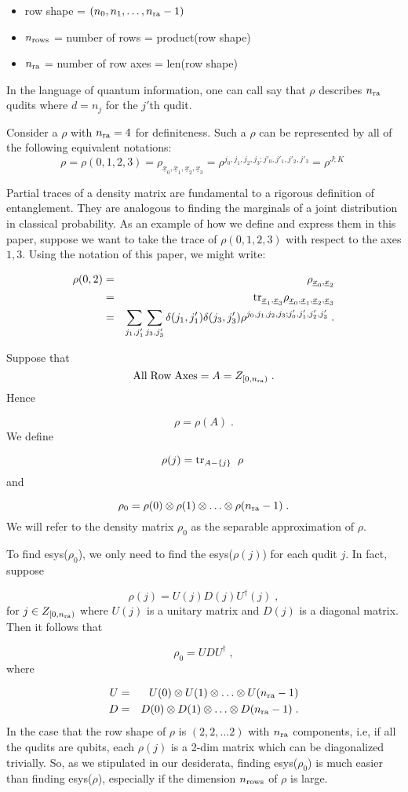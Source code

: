 \documentclass[12pt]{article}%
\newcommand{\tr}[0]{{\rm tr }}
\newcommand{\beq}{\begin{equation}}
\newcommand{\eeq}{\end{equation}}
\newcommand{\beqa}{\begin{eqnarray}}
\newcommand{\eeqa}{\end{eqnarray}}
\newcommand{\ul}[1]{\underline{#1}}
\newcommand{\rvx}[0]{{\ul{x}}}
\newcommand{\nra}[0]{{n_{\rm ra}}}
\newcommand{\nr}[0]{{n_{\rm rows}}}
\begin{document}
\begin{itemize}
\item row shape = $(n_0, n_1, \ldots, \nra-1)$
\item $\nr$ = number of rows = product(row shape)
\item $\nra$ = number of row axes = len(row shape)
\end{itemize}
In the language of quantum information,
one can call say that $\rho$ describes $\nra$
qudits where $d=n_j$ for the $j'$th qudit.

Consider a $\rho$
with $\nra = 4$ for definiteness.
Such a $\rho$ can be represented by all of the following
equivalent notations:
\beq
\rho= \rho(0, 1, 2, 3) =\rho_{\rvx_0, \rvx_1, \rvx_2, \rvx_3}=
\rho^{j_0, j_1, j_2, j_3; j'_0, j'_1, j'_2, j'_3}
=\rho^{J;K}
\;
\eeq

Partial traces
of a density matrix
are fundamental to a rigorous definition
of entanglement. They are analogous to
finding the marginals of a
joint distribution in classical
probability. As an example of how we define
and express them in this paper,
suppose we want to
take the trace of $\rho(0, 1, 2, 3)$
with respect to the axes $1, 3$.
Using the notation of
this paper, we might write:

\beqa
\rho(0,2) &=&\rho_{\rvx_0,\rvx_2}
\\&=&
\tr_{\rvx_1, \rvx_3}\rho_{\rvx_0, \rvx_1, \rvx_2, \rvx_3}
\\&=&\sum_{j_1, j'_1}\sum_{j_3, j'_3}
\delta(j_1, j'_1)
\delta(j_3, j_3') \rho^{j_0, j_1, j_2, j_3; j'_0, j'_1, j'_2, j'_3}
\;.
\eeqa

Suppose that
\beq
{\rm All\;Row\;Axes} = A = Z_{[0, \nra)}
\;.
\eeq
Hence

\beq
\rho= \rho(A)
\;.
\eeq
We define

\beq
\rho(j) = \tr_{A-\{j\}}
\;\;\rho
\;
\eeq
and

\beq
\rho_0 = \rho(0)\otimes \rho(1)
\otimes\ldots \otimes \rho(\nra-1)
\;.
\eeq
We will refer to the density matrix $\rho_0$ as
the separable approximation of $\rho$.

To find esys($\rho_0$),
we only need to find
the esys($\rho(j)$) for each qudit $j$.
In fact, suppose

\beq
\rho(j) = U(j)D(j)U^\dag(j)
\;,
\eeq
for $j\in Z_{[0, \nra)}$ where $U(j)$
is a unitary matrix and $D(j)$
is a diagonal matrix. Then it follows that

\beq
\rho_0 = UDU^\dag
\;,
\eeq
where

\beqa
U &=& U(0)\otimes U(1)\otimes\ldots\otimes U(\nra-1)
\\
D &=& D(0)\otimes D(1)\otimes\ldots\otimes D(\nra-1)
\;.
\eeqa
In the case that the
row shape
of $\rho$ is $(2,2, \ldots 2)$
with $\nra$ components, i.e, if all the qudits are qubits,
each $\rho(j)$
is a 2-dim matrix which can be diagonalized
trivially. So,
as we stipulated in our desiderata,
finding esys($\rho_0$)
is much easier than finding
esys($\rho$), especially if
the dimension $\nr$ of $\rho$ is large.
\end{document}
